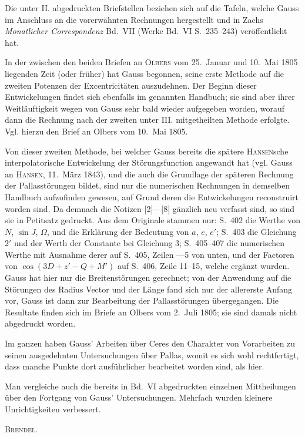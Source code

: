 \documentclass[12pt,a4paper]{article}
\begin{document}
Die unter II. abgedruckten Briefstellen beziehen sich auf die Tafeln, welche Gauss im Anschluss an die vorerwähnten Rechnungen hergestellt und in Zachs \textit{Monatlicher Correspondenz} Bd.~VII (Werke Bd.~VI S.~235--243) veröffentlicht hat.

In der zwischen den beiden Briefen an \textsc{Olbers} vom 25.~Januar und 10.~Mai 1805 liegenden Zeit (oder früher) hat Gauss begonnen, seine erste Methode auf die zweiten Potenzen der Excentricitäten auszudehnen. Der Beginn dieser Entwickelungen findet sich ebenfalls im genannten Handbuch; sie sind aber ihrer Weitläuftigkeit wegen von Gauss sehr bald wieder aufgegeben worden, worauf dann die Rechnung nach der zweiten unter III. mitgetheilten Methode erfolgte. Vgl. hierzu den Brief an Olbers vom 10.~Mai 1805.

Von dieser zweiten Methode, bei welcher Gauss bereits die spätere \textsc{Hansen}sche interpolatorische Entwickelung der Störungsfunction angewandt hat (vgl. Gauss an \textsc{Hansen}, 11.~März 1843), und die auch die Grundlage der späteren Rechnung der Pallasstörungen bildet, sind nur die numerischen Rechnungen in demselben Handbuch aufzufinden gewesen, auf Grund deren die Entwickelungen reconstruirt worden sind. Da demnach die Notizen [2]---[8] gänzlich neu verfasst sind, so sind sie in Petitsatz gedruckt. Aus dem Originale stammen nur: S.~402 die Werthe von $N$, $\sin J$, $\Omega$, und die Erklärung der Bedeutung von $a$, $e$, $e'$; S.~403 die Gleichung 2$'$ und der Werth der Constante bei Gleichung 3; S.~405--407 die numerischen Werthe mit Ausnahme derer auf S.~405, Zeilen ---5 von unten, und der Factoren von $\cos(3D + z' - Q + M')$ auf S.~406, Zeile 11--15, welche ergänzt wurden. Gauss hat hier nur die Breitenstörungen gerechnet; von der Anwendung auf die Störungen des Radius Vector und der Länge fand sich nur der allererste Anfang vor, Gauss ist dann zur Bearbeitung der Pallasstörungen übergegangen. Die Resultate finden sich im Briefe an Olbers vom 2.~Juli 1805; sie sind damals nicht abgedruckt worden.

Im ganzen haben Gauss' Arbeiten über Ceres den Charakter von Vorarbeiten zu seinen ausgedehnten Untersuchungen über Pallas, womit es sich wohl rechtfertigt, dass manche Punkte dort ausführlicher bearbeitet worden sind, als hier.

Man vergleiche auch die bereits in Bd.~VI abgedruckten einzelnen Mittheilungen über den Fortgang von Gauss' Untersuchungen. Mehrfach wurden kleinere Unrichtigkeiten verbessert.

\begin{flushright}
\textsc{Brendel.}
\end{flushright}
\end{document}
